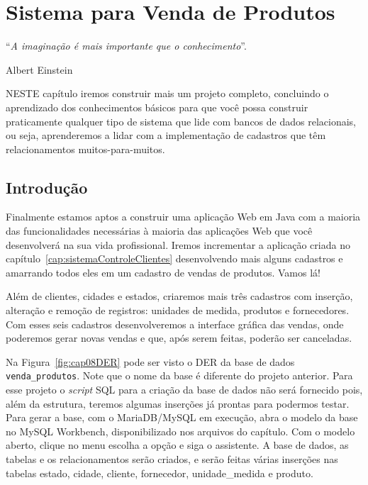 \chapter{Sistema para Venda de Produtos}\label{cap:sistemaVendaProdutos}
\epigraph{``\textit{A imaginação é mais importante que o conhecimento}''.}{Albert Einstein}

\lettrine[lines=4, lhang=0.1, lraise=0, loversize=0.2, findent=0.1em]{\textcolor{corTema}{N}}{ESTE} capítulo iremos construir mais um projeto completo, concluindo o aprendizado dos conhecimentos básicos para que você possa construir praticamente qualquer tipo de sistema que lide com bancos de dados relacionais, ou seja, aprenderemos a lidar com a implementação de cadastros que têm relacionamentos muitos-para-muitos.


\section{Introdução}

Finalmente estamos aptos a construir uma aplicação Web em Java com a maioria das funcionalidades necessárias à maioria das aplicações Web que você desenvolverá na sua vida profissional. Iremos incrementar a aplicação criada no capítulo~\ref{cap:sistemaControleClientes} desenvolvendo mais alguns cadastros e amarrando todos eles em um cadastro de vendas de produtos. Vamos lá!

Além de clientes, cidades e estados, criaremos mais três cadastros com inserção, alteração e remoção de registros: unidades de medida, produtos e fornecedores. Com esses seis cadastros desenvolveremos a interface gráfica das vendas, onde poderemos gerar novas vendas e que, após serem feitas, poderão ser canceladas.

Na Figura~\ref{fig:cap08DER} pode ser visto o DER da base de dados \texttt{venda\_produtos}. Note que o nome da base é diferente do projeto anterior. Para esse projeto o \textit{script} SQL para a criação da base de dados não será fornecido pois, além da estrutura, teremos algumas inserções já prontas para podermos testar. Para gerar a base, com o MariaDB/MySQL em execução, abra o modelo da base no MySQL Workbench, disponibilizado nos arquivos do capítulo. Com o modelo aberto, clique no menu  escolha a opção  e siga o assistente. A base de dados, as tabelas e os relacionamentos serão criados, e serão feitas várias inserções nas tabelas estado, cidade, cliente, fornecedor, unidade\_medida e produto.

